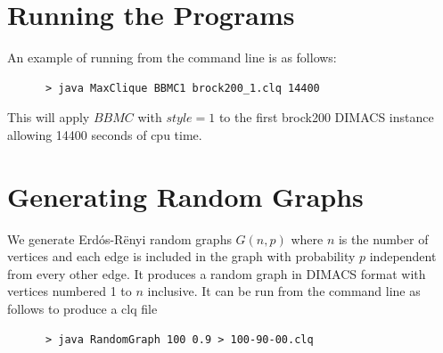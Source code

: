 \documentclass{l4proj}
\begin{document}
\begin{appendices}

\chapter{Running the Programs}
An example of running from the command line is as follows:
\begin{verbatim}
      > java MaxClique BBMC1 brock200_1.clq 14400
\end{verbatim}
This will apply $BBMC$ with $style = 1$ to the first brock200 DIMACS instance allowing 14400 seconds of cpu time.

\chapter{Generating Random Graphs}
\label{sec:randomGraph}
We generate Erd\'{o}s-R\"{e}nyi random graphs $G(n,p)$ where $n$ is the number of vertices and
each edge is included in the graph with probability $p$ independent from every other edge. It produces
a random graph in DIMACS format with vertices numbered 1 to $n$ inclusive. It can be run from the command line as follows to produce 
a clq file
\begin{verbatim}
      > java RandomGraph 100 0.9 > 100-90-00.clq
\end{verbatim}
\end{appendices}




\end{document}
